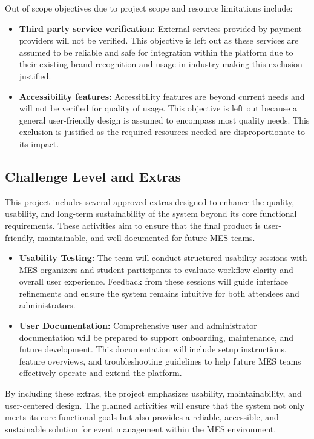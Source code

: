\documentclass[12pt, titlepage]{article}
\begin{document}
Out of scope objectives due to project scope and resource limitations include:
\begin{itemize}
    \item \textbf{Third party service verification:} External services provided by payment providers will not be verified. This objective is left out as these services are assumed to be reliable and safe for integration within the platform due to their existing brand recognition and usage in industry making this exclusion justified. 
    \item \textbf{Accessibility features:} Accessibility features are beyond current needs and will not be verified for quality of usage. This objective is left out because a general user-friendly design is assumed to encompass most quality needs. This exclusion is justified as the required resources needed are disproportionate to its impact.    
\end{itemize}


\subsection{Challenge Level and Extras}

This project includes several approved extras designed to enhance the quality, usability, and long-term sustainability of the system beyond its core functional requirements. These activities aim to ensure that the final product is user-friendly, maintainable, and well-documented for future MES teams.

\begin{itemize}
    \item \textbf{Usability Testing:} The team will conduct structured usability sessions with MES organizers and student participants to evaluate workflow clarity and overall user experience. Feedback from these sessions will guide interface refinements and ensure the system remains intuitive for both attendees and administrators.
    \item \textbf{User Documentation:} Comprehensive user and administrator documentation will be prepared to support onboarding, maintenance, and future development. This documentation will include setup instructions, feature overviews, and troubleshooting guidelines to help future MES teams effectively operate and extend the platform.
\end{itemize}

By including these extras, the project emphasizes usability, maintainability, and user-centered design. The planned activities will ensure that the system not only meets its core functional goals but also provides a reliable, accessible, and sustainable solution for event management within the MES environment.
\end{document}
